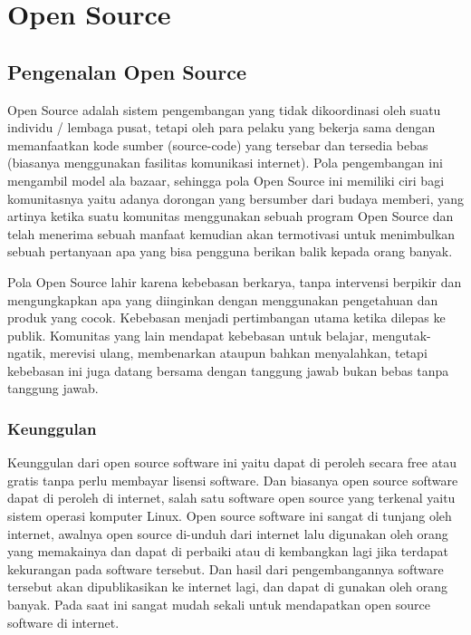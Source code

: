 \documentclass[../wastek.tex]{subfiles}
\begin{document}
\section{Open Source}%
\label{sec:Open Source}

\subsection{Pengenalan Open Source}%
\label{sub:Pengenalan Open Source}


Open Source adalah sistem pengembangan yang tidak dikoordinasi oleh suatu individu / lembaga pusat, tetapi oleh para pelaku yang bekerja sama dengan memanfaatkan kode sumber (source-code) yang tersebar dan tersedia bebas (biasanya menggunakan fasilitas komunikasi internet). Pola pengembangan ini mengambil model ala bazaar, sehingga pola Open Source ini memiliki ciri bagi komunitasnya yaitu adanya dorongan yang bersumber dari budaya memberi, yang artinya ketika suatu komunitas menggunakan sebuah program Open Source dan telah menerima sebuah manfaat kemudian akan termotivasi untuk menimbulkan sebuah pertanyaan apa yang bisa pengguna berikan balik kepada orang banyak.

Pola Open Source lahir karena kebebasan berkarya, tanpa intervensi berpikir dan mengungkapkan apa yang diinginkan dengan menggunakan pengetahuan dan produk yang cocok. Kebebasan menjadi pertimbangan utama ketika dilepas ke publik. Komunitas yang lain mendapat kebebasan untuk belajar, mengutak-ngatik, merevisi ulang, membenarkan ataupun bahkan menyalahkan, tetapi kebebasan ini juga datang bersama dengan tanggung   jawab   bukan   bebas   tanpa   tanggung   jawab.

\subsubsection{Keunggulan}%
\label{ssub:keunggulan}

Keunggulan dari open source software ini yaitu dapat di peroleh secara free atau gratis tanpa perlu membayar lisensi software. Dan biasanya open source software dapat di peroleh di internet, salah satu software open source yang terkenal yaitu sistem operasi komputer Linux. Open source software ini sangat di tunjang oleh internet, awalnya open source di-unduh dari internet lalu digunakan oleh orang yang memakainya dan dapat di perbaiki atau di kembangkan lagi jika terdapat kekurangan pada software tersebut. Dan hasil dari pengembangannya software tersebut akan dipublikasikan ke internet lagi, dan dapat di gunakan oleh orang banyak. Pada saat ini sangat mudah sekali untuk mendapatkan open source software di internet.
\end{document}
